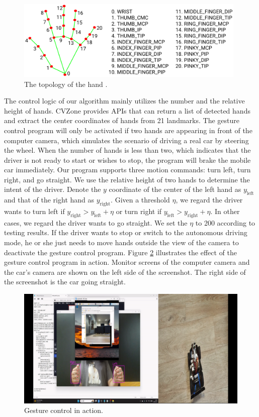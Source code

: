 \documentclass[acmsmall]{acmart}
\begin{document}
\begin{figure}[!ht]
    \centering
    \includegraphics[width=11cm]{./hand.png}
    \caption{The topology of the hand \cite{google}.}
    \label{fig:hand}
\end{figure}

The control logic of our algorithm mainly utilizes the number and the relative height of hands. CVZone provides APIs that can return a list of detected hands and extract the center coordinates of hands from 21 landmarks. The gesture control program will only be activated if two hands are appearing in front of the computer camera, which simulates the scenario of driving a real car by steering the wheel. When the number of hands is less than two, which indicates that the driver is not ready to start or wishes to stop, the program will brake the mobile car immediately. Our program supports three motion commands: turn left, turn right, and go straight. We use the relative height of two hands to determine the intent of the driver. Denote the $y$ coordinate of the center of the left hand as $y_{\text{left}}$ and that of the right hand as $y_{\text{right}}$. Given a threshold $\eta$, we regard the driver wants to turn left if $y_{\text{right}} > y_{\text{left}} + \eta$ or turn right if $y_{\text{left}} > y_{\text{right}} + \eta$. In other cases, we regard the driver wants to go straight. We set the $\eta$ to 200 according to testing results. If the driver wants to stop or switch to the autonomous driving mode, he or she just needs to move hands outside the view of the camera to deactivate the gesture control program. Figure \ref{fig:gesture-control} illustrates the effect of the gesture control program in action. Monitor screens of the computer camera and the car's camera are shown on the left side of the screenshot. The right side of the screenshot is the car going straight.
\begin{figure}[!ht]
    \centering
    \includegraphics[width=13cm]{./gesture-control.png}
    \caption{Gesture control in action.}
    \label{fig:gesture-control}
\end{figure}
\end{document}

